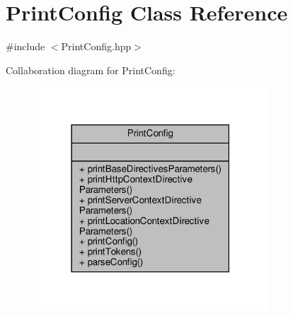 \hypertarget{classft_1_1_print_config}{}\section{Print\+Config Class Reference}
\label{classft_1_1_print_config}


{\ttfamily \#include $<$Print\+Config.\+hpp$>$}



Collaboration diagram for Print\+Config\+:
\nopagebreak
\begin{figure}[H]
\begin{center}
\leavevmode
\includegraphics[width=247pt]{classft_1_1_print_config__coll__graph}
\end{center}
\end{figure}
